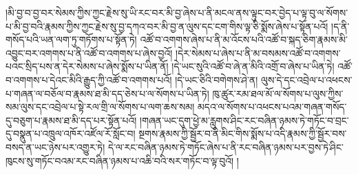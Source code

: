 །མི་བྱ་བ་བྱ་བར་སེམས་ཀྱིས་ཀྱང་རྗེས་སུ་ཡི་རང་བར་མི་བྱ་ཞེས་པ་ནི་མངལ་ནས་ལྟུང་བར་བྱེད་པ་ལྟ་བུ་ལ་སོགས་པ་མི་བྱ་བའི་རྣམས་ཀྱིས་ཀྱང་རྗེས་སུ་བྱ་དཀའ་བར་མི་བྱ་ན་ལུས་དང་ངག་གིས་ལྟ་ཅི་སྨོས་ཞེས་པ་སྟོན་པའོ། །ད་ནི་གསོད་པའི་ཡན་ལག་ཏུ་གཏོགས་པ་སྟོན་ཏེ། འཚོ་བ་འགགས་ཞེས་པ་ནི་མ་འོངས་པའི་འཚོ་བ་སྐད་ཅིག་རྣམས་མི་འབྱུང་བར་འགགས་པ་ནི་འཚོ་བ་འགགས་པ་ཞེས་བྱའོ། །དེར་སེམས་པ་ཞེས་པ་ནི་མ་བསམས་འཚོ་བ་འགགས་པའང་སྲིད་པས་ན་དེར་སེམས་པ་ཞེས་སྨོས་པ་ཡིན་ནོ། །དེ་ཡང་སུའི་འཚོ་བ་ཞེ་ན་མིའི་འགྲོ་བ་ཞེས་པ་ཡིན་ཏེ། འཚོ་བ་འགགས་པ་དེའང་མིའི་རྒྱུད་ཀྱི་འཚོ་བ་འགགས་པའོ། །དེ་ཡང་ཅིའི་བགེགས་ཤེ་ན། ལུས་དེ་དང་འབྲེལ་པ་འཕངས་པ་གཞན་ལ་བཅོལ་བ་རྣམས་ཐ་མི་དད་ཅེས་པ་ལ་སོགས་པ་ཡིན་ཏེ། ཁུ་ཚུར་རམ་ཐལ་མོ་ལ་སོགས་པ་ལུས་ཀྱིས་སམ་ལུས་དང་འབྲེལ་པ་སྟེ་རལ་གྲི་ལ་སོགས་པ་ལག་ཆས་སམ། མདའ་ལ་སོགས་པ་འཕངས་པའམ་གཞན་གསོད་དུ་བཅུག་པ་རྣམས་ཐ་མི་དད་པར་སྟོན་པའོ། །གཞན་ཡང་དུག་ཕྱེ་མ་རླུགས་ཤིང་རང་བཞིན་ཉམས་ཏེ་གཏོང་བ་བྲང་དུ་བསྣུན་པ་འཁྲུལ་འཁོར་འཛོལ་རོ་སློང་བ། སྔགས་རྣམས་ཀྱི་སྦྱོར་བ་ནི་མིང་གིས་སྨོས་པ་འདི་རྣམས་ཀྱི་སྦྱོར་བས་བསད་ན་ཡང་ཉེས་པར་འགྱུར་ཏེ། དེ་ལ་རང་བཞིན་ཉམས་ཏེ་གཏོང་ཞེས་པ་ནི་རང་བཞིན་ཉམས་པར་བྱས་ཏེ་ཤིང་ཁུངས་སུ་གཏོང་བའམ་རང་བཞིན་ཉམས་པ་འཆི་བའི་སར་གཏོང་བ་ལྟ་བུའོ། །
